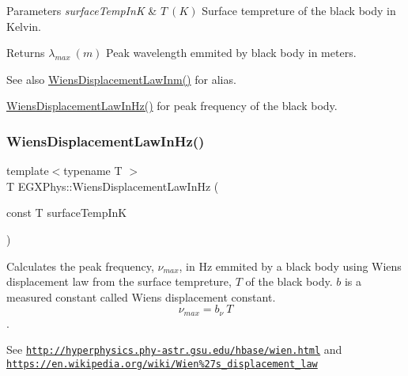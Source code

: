 \begin{DoxyParams}{Parameters}
{\em surface\+Temp\+InK} & $T\ (K)$ Surface tempreture of the black body in Kelvin. \\
\hline
\end{DoxyParams}
\begin{DoxyReturn}{Returns}
$\lambda_{max}\ (m)$ Peak wavelength emmited by black body in meters. 
\end{DoxyReturn}
\begin{DoxySeeAlso}{See also}
\mbox{\hyperlink{group___e_g_x_phys-_electrodynamics-_black_body-_wiens_displacement_law_ga126ebb146c31a2371f1d1d001d11c62f}{Wiens\+Displacement\+Law\+Inm()}} for alias. 

\mbox{\hyperlink{group___e_g_x_phys-_electrodynamics-_black_body-_wiens_displacement_law_gaf09ffbc9b7133c16da786c1609ecf689}{Wiens\+Displacement\+Law\+In\+Hz()}} for peak frequency of the black body. 
\end{DoxySeeAlso}
\mbox{\label{group___e_g_x_phys-_electrodynamics-_black_body-_wiens_displacement_law_gaf09ffbc9b7133c16da786c1609ecf689}} 
\subsubsection{\texorpdfstring{Wiens\+Displacement\+Law\+In\+Hz()}{WiensDisplacementLawInHz()}}
{\footnotesize\ttfamily template$<$typename T $>$ \\
T E\+G\+X\+Phys\+::\+Wiens\+Displacement\+Law\+In\+Hz (\begin{DoxyParamCaption}\item[{const T}]{surface\+Temp\+InK }\end{DoxyParamCaption})}



Calculates the peak frequency, $\nu_{max}$, in Hz emmited by a black body using Wien\textquotesingle{}s displacement law from the surface tempreture, $T$ of the black body. $b$ is a measured constant called Wien\textquotesingle{}s displacement constant. \[\nu_{max} = b_\nu\ T \]. 

See \href{http://hyperphysics.phy-astr.gsu.edu/hbase/wien.html}{\tt http\+://hyperphysics.\+phy-\/astr.\+gsu.\+edu/hbase/wien.\+html} and \href{https://en.wikipedia.org/wiki/Wien%27s_displacement_law}{\tt https\+://en.\+wikipedia.\+org/wiki/\+Wien\%27s\+\_\+displacement\+\_\+law}


